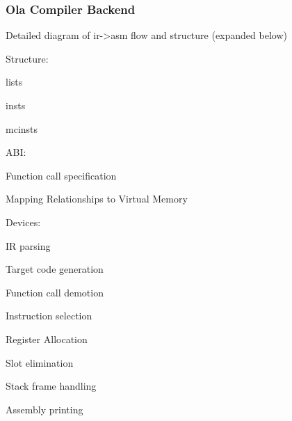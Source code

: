 \subsubsection{Ola Compiler Backend}

Detailed diagram of ir->asm flow and structure (expanded below)

Structure:

    lists

    insts

    mcinsts

ABI:

    Function call specification

    Mapping Relationships to Virtual Memory

Devices:

    IR parsing

    Target code generation

        Function call demotion

        Instruction selection

        Register Allocation

        Slot elimination

        Stack frame handling

        Assembly printing